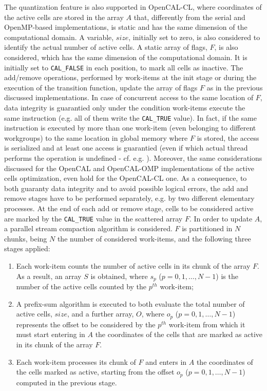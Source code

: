 The quantization feature is also supported in OpenCAL-CL, where
coordinates of the active cells are stored in the array $A$ that,
differently from the serial and OpenMP-based implementations, is
static and has the same dimension of the computational domain. A
variable, $size$, initially set to zero, is also considered to
identify the actual number of active cells. A static array of flags,
$F$, is also considered, which has the same dimension of the
computational domain. It is initially set to \verb'CAL_FALSE' in
each position, to mark all cells as inactive. The add/remove
operations, performed by work-items at the init stage or during the
execution of the transition function, update the array of flags $F$
as in the previous discussed implementations. In case of concurrent
access to the same location of $F$, data integrity is guarantied
only under the condition work-items execute the same instruction
(e.g. all of them write the \verb'CAL_TRUE' value). In fact, if the
same instruction is executed by more than one work-item (even
belonging to different workgroups) to the same location in global
memory where $F$ is stored, the access is serialized and at least
one access is guarantied (even if which actual thread performs the
operation is undefined - cf. e.g. \cite{CUDA}). Moreover, the same
considerations discussed for the OpenCAL and OpenCAL-OMP
implementations of the active cells optimization, even hold for the
OpenCAL-CL one. As a consequence, to both guaranty data integrity
and to avoid possible logical errors, the add and remove stages have
to be performed separately, e.g. by two different elementary
processes. At the end of each add or remove stage, cells to be
considered active are marked by the \verb'CAL_TRUE' value in the
scattered array $F$. In order to update $A$, a parallel stream
compaction algorithm is considered. $F$ is partitioned in $N$
chunks, being $N$ the number of considered work-items, and the
following three stages applied:
\begin{enumerate}
	\item Each work-item counts the number of active cells in its chunk
	of the array $F$. As a result, an array $S$ is obtained, where
	$s_p$ ($p = 0, 1, \ldots, N-1$) is the number of the active cells
	counted by the $p^{th}$ work-item;
	\item A prefix-sum algorithm is executed to both evaluate the total
	number of active cells, $size$, and a further array, $O$, where
	$o_p$ ($p = 0, 1, \ldots, N-1$) represents the offset to be
	considered by the $p^{th}$ work-item from which it must start
	entering in $A$ the coordinates of the cells that are marked as
	active in its chunk of the array $F$.
	\item Each work-item processes its chunk of $F$ and enters in $A$
	the coordinates of the cells marked as active, starting from the
	offset $o_p$ ($p = 0, 1, \ldots, N-1$) computed in the previous
	stage.
\end{enumerate}

